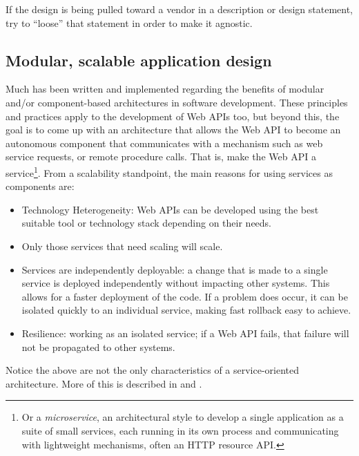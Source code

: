 \documentclass[10pt,article]{IEEEtran}
\begin{document}
If the design is being pulled toward a vendor in a description or design statement, try to ``loose'' that statement in order to make it agnostic.


  

 


\subsection{Modular, scalable application design}
Much has been written and implemented regarding the benefits of modular and/or component-based architectures in software development. These principles and practices apply to the development of Web APIs too, but beyond this, the goal is to come up with an architecture that allows the Web API to become an autonomous component that communicates with a mechanism such as web service requests, or remote procedure calls. That is, make the Web API a service\footnote{Or a \textit{microservice}, an architectural style to develop a single application as a suite of small services, each running in its own process and communicating with lightweight mechanisms, often an HTTP resource API\cite{monolit:fowler}. }.
From a scalability standpoint, the main reasons for using services as components are:
\begin{itemize}
    \item
    Technology Heterogeneity: Web APIs can be developed using the best suitable tool or technology stack depending on their needs.
    \item
    Only those services that need scaling will scale.
    \item
    Services are independently deployable: a change that is made to a single service is deployed  independently without impacting other systems. This allows for a faster deployment of the code. If a problem does occur, it can be isolated quickly to an individual service, making fast rollback easy to achieve.
    \item
    Resilience: working as an isolated service; if a Web API fails, that failure will not be propagated to other systems.
\end{itemize}

Notice the above are not the only characteristics of a service-oriented architecture. More of this is described in \cite{microservices} and \cite{monolit:fowler}. 
\end{document}
